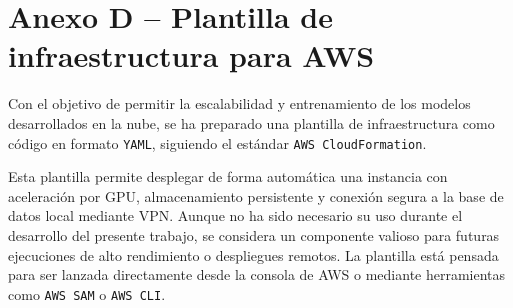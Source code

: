 \section*{Anexo D – Plantilla de infraestructura para AWS}
\label{anexo:plantilla_aws}

Con el objetivo de permitir la escalabilidad y entrenamiento de los modelos desarrollados en la nube, se ha preparado una plantilla de infraestructura como código en formato \texttt{YAML}, siguiendo el estándar \texttt{AWS CloudFormation}.

Esta plantilla permite desplegar de forma automática una instancia con aceleración por GPU, almacenamiento persistente y conexión segura a la base de datos local mediante VPN. Aunque no ha sido necesario su uso durante el desarrollo del presente trabajo, se considera un componente valioso para futuras ejecuciones de alto rendimiento o despliegues remotos. La plantilla está pensada para ser lanzada directamente desde la consola de AWS o mediante herramientas como \texttt{AWS SAM} o \texttt{AWS CLI}.


